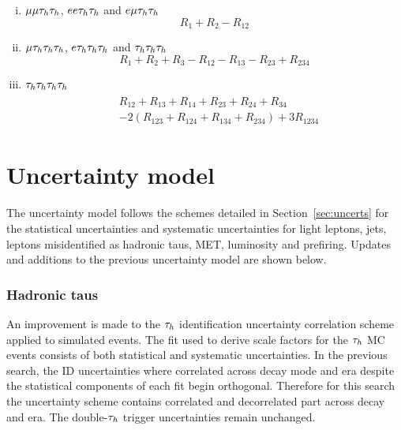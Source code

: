 \begin{enumerate}[i)]
\item $\mu\mu\tau_{h}\tau_{h}$, $ee\tau_{h}\tau_{h}$ and $e\mu\tau_{h}\tau_{h}$
\begin{equation}
R_1 + R_2 - R_{12}
\end{equation}

\item $\mu\tau_{h}\tau_{h}\tau_{h}$, $e\tau_{h}\tau_{h}\tau_{h}$ and $\tau_{h}\tau_{h}\tau_{h}$
\begin{equation}
R_1 + R_2 + R_3 - R_{12} - R_{13} - R_{23} + R_{234}
\end{equation}

\item $\tau_{h}\tau_{h}\tau_{h}\tau_{h}$
\begin{align}
\begin{split}
&R_{12} + R_{13} + R_{14} + R_{23} + R_{24} + R_{34} \\
&- 2(R_{123} + R_{124} + R_{134} + R_{234}) + 3R_{1234}
\end{split}
\end{align}
\end{enumerate}
 
\section{Uncertainty model}

The uncertainty model follows the schemes detailed in Section~\ref{sec:uncerts} for the statistical uncertainties and systematic uncertainties for light leptons, jets, leptons misidentified as hadronic taus, MET, luminosity and prefiring.
Updates and additions to the previous uncertainty model are shown below. \\

\subsubsection{Hadronic taus}
An improvement is made to the $\tau_{h}$ identification uncertainty correlation scheme applied to simulated events.
The fit used to derive scale factors for the $\tau_{h}$ \ac{MC} events consists of both statistical and systematic uncertainties.
In the previous search, the ID uncertainties where correlated across decay mode and era despite the statistical components of each fit begin orthogonal.
Therefore for this search the uncertainty scheme contains correlated and decorrelated part across decay and era.
The double-$\tau_{h}$ trigger uncertainties remain unchanged. \\

